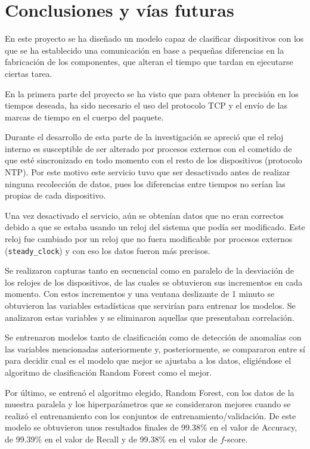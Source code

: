 
\chapter{Conclusiones y vías futuras} \label{chap:conclu}

En este proyecto se ha diseñado un modelo capaz de clasificar dispositivos con los que se ha establecido una comunicación en base a pequeñas diferencias en la fabricación de los componentes, que alteran el tiempo que tardan en ejecutarse ciertas tarea.

En la primera parte del proyecto se ha visto que para obtener la precisión en los tiempos deseada, ha sido necesario el uso del protocolo TCP y el envío de las marcas de tiempo en el cuerpo del paquete. 

Durante el desarrollo de esta parte de la investigación se apreció que el reloj interno es susceptible de ser alterado por procesos externos con el cometido de que esté sincronizado en todo momento con el resto de los dispositivos (protocolo NTP). Por este motivo este servicio tuvo que ser desactivado antes de realizar ninguna recolección de datos, pues los diferencias entre tiempos no serían las propias de cada dispositivo.

Una vez desactivado el servicio, aún se obtenían datos que no eran correctos debido a que se estaba usando un reloj del sistema que podía ser modificado. Este reloj fue cambiado por un reloj que no fuera modificable por procesos externos (\texttt{steady\_clock}) y con eso los datos fueron más precisos.

Se realizaron capturas tanto en secuencial como en paralelo de la desviación de los relojes de los dispositivos, de las cuales se obtuvieron sus incrementos en cada momento. Con estos incrementos y una ventana deslizante de 1 minuto se obtuvieron las variables estadísticas que servirían para entrenar los modelos. Se analizaron estas variables y se eliminaron aquellas que presentaban correlación.

Se entrenaron modelos tanto de clasificación como de detección de anomalías con las variables mencionadas anteriormente y, posteriormente, se compararon entre sí para decidir cual es el modelo que mejor se ajustaba a los datos, eligiéndose el algoritmo de clasificación Random Forest como el mejor.

Por último, se entrenó el algoritmo elegido, Random Forest, con los datos de la muestra paralela y los hiperparámetros que se consideraron mejores cuando se realizó el entrenamiento con los conjuntos de entrenamiento/validación. De este modelo se obtuvieron unos resultados finales de 99.38\% en el valor de Accuracy, de 99.39\% en el valor de Recall y de 99.38\% en el valor de $f$-score.

